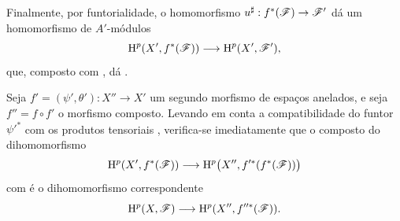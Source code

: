\begin{env}[12.1.3]
Finalmente, por funtorialidade, o homomorfismo
$u^\sharp:f^*(\sh{F})\to\sh{F}'$ dá um homomorfismo de
$A'$-módulos
\[
  \mathrm{H}^p(X',f^*(\mathscr{F}))
  \longrightarrow
  \mathrm{H}^p(X',\mathscr{F}'),
\]
que, composto com , dá
.

Seja $f'=(\psi',\theta'):X''\to X'$ um segundo morfismo de espaços
anelados, e seja $f''=f\circ f'$ o morfismo composto.
Levando em conta a compatibilidade do funtor $\psi'^*$ com os
produtos tensoriais , verifica-se
imediatamente que o composto do dihomomorfismo
\[
  \mathrm{H}^p(X',f^*(\mathscr{F}))
  \longrightarrow
  \mathrm{H}^p\bigl(X'',f'^*(f^*(\mathscr{F}))\bigr)
\]
com  é o dihomomorfismo correspondente
\[
  \mathrm{H}^p(X,\mathscr{F})
  \longrightarrow
  \mathrm{H}^p(X'',f''^*(\mathscr{F})).
\]
\end{env}

